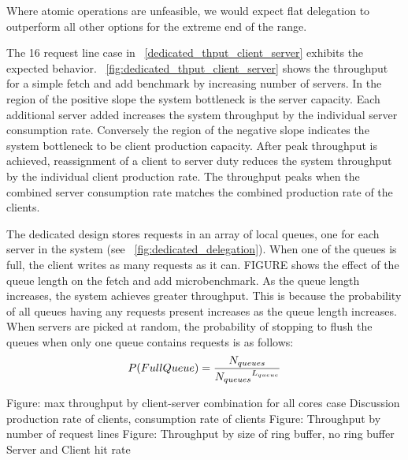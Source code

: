 \documentclass{uicthesi}
\begin{document}
Where atomic operations are unfeasible, we would expect flat delegation to outperform all other options for the extreme end of the range. 





The 16 request line case in ~\ref{dedicated_thput_client_server} exhibits the expected behavior. ~\ref{fig:dedicated_thput_client_server} shows the throughput for a simple fetch and add benchmark by increasing number of servers. In the region of the positive slope the system bottleneck is the server capacity. Each additional server added increases the system throughput by the individual server consumption rate. Conversely the region of the negative slope indicates the system bottleneck to be client production capacity. After peak throughput is achieved, reassignment of a client to server duty reduces the system throughput by the individual client production rate. The throughput peaks when the combined server consumption rate matches the combined production rate of the clients. 

The dedicated design stores requests in an array of local queues, one for each server in the system (see ~\ref{fig:dedicated_delegation}).  When one of the queues is full, the client writes as many requests as it can.  FIGURE shows the effect of the queue length on the fetch and add microbenchmark. As the queue length increases, the system achieves greater throughput. This is because the probability of all queues having any requests present increases as the queue length increases. When servers are picked at random, the probability of stopping to flush the queues when only one queue contains requests is as follows: 
\begin{displaymath}
P(Full Queue) = {N_{queues} \over {N_{queues}}^{L_{queue}}}
\end{displaymath}



Figure: max throughput by client-server combination for all cores case
	Discussion production rate of clients, consumption rate of clients
Figure: Throughput by number of request lines
Figure: Throughput by size of ring buffer, no ring buffer
	Server and Client hit rate
\end{document}
